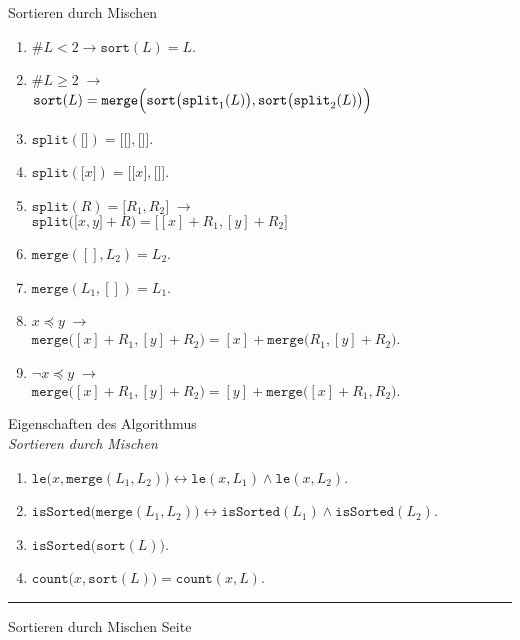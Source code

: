 \documentclass{slides}
\newcounter{mypage}
\begin{document}
\begin{slide}{}
\normalsize

\begin{center}
Sortieren durch Mischen
\end{center}
\vspace*{0.5cm}

\footnotesize
\begin{enumerate}
\item $\#L < 2 \rightarrow \mathtt{sort}(L) = L$.
\item $\#L \geq 2 \;\rightarrow $ \\
      $ \mathtt{sort}(L) = \mathtt{merge}\Bigl(\mathtt{sort}\bigl(\mathtt{split}_1(L)\bigr), \mathtt{sort}\bigl(\mathtt{split}_2(L)\bigr)\Bigr)$
\item $\mathtt{split}(\texttt{[]}) = \mathtt{[} \texttt{[]}, \texttt{[]} \mathtt{]}$.
\item $\mathtt{split}(\mathtt{[}x\mathtt{]}) = \mathtt{[} \texttt{[}x\texttt{]}, \texttt{[]} \mathtt{]}$.
\item $\mathtt{split}(R) = \mathtt{[}R_1, R_2\mathtt{]} \;\rightarrow$ \\
      $\mathtt{split}\bigl(\mathtt{[}x, y\mathtt{]} + R\bigr) = \bigl[ [x] + R_1, [y] + R_2 \bigr]$
\item $\mathtt{merge}([], L_2) = L_2$.

\item $\mathtt{merge}(L_1, []) = L_1$.

\item $x \preceq y \;\rightarrow$ \\
      $\mathtt{merge}\bigl([x]+R_1, [y]+R_2\bigr) = [x] + \mathtt{merge}\bigl(R_1,[y]+R_2\bigr)$.

\item $\neg x \preceq y \;\rightarrow$ \\ 
      $\mathtt{merge}\bigl([x]+R_1, [y]+R_2\bigr) = [y] + \mathtt{merge}\bigl([x] + R_1,R_2\bigr)$.
\end{enumerate}

\begin{center}
{\normalsize
Eigenschaften des Algorithmus \\ \textsl{Sortieren durch Mischen}}
\end{center}

\begin{enumerate}
\item $\texttt{le}\bigl(x,\texttt{merge}(L_1,L_2)\bigr) \leftrightarrow \texttt{le}(x,L_1) \wedge \mathtt{le}(x,L_2)$.
\item $\texttt{isSorted}\bigl(\texttt{merge}(L_1,L_2)\bigr) \leftrightarrow \mathtt{isSorted}(L_1) \wedge \mathtt{isSorted}(L_2)$.
\item $\mathtt{isSorted}\bigl(\mathtt{sort}(L)\bigr)$.
\item $\mathtt{count}\bigl(x,\mathtt{sort}(L)\bigr) = \mathtt{count}(x,L)$.
\end{enumerate}

\vspace*{\fill}
\tiny \addtocounter{mypage}{1}
\rule{17cm}{1mm}
Sortieren durch Mischen \hspace*{\fill} Seite 
\end{slide}
\end{document}
